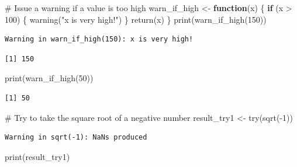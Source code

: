 \documentclass[
  letterpaper,
  DIV=11,
  numbers=noendperiod]{scrartcl}
\newenvironment{Shaded}{\begin{snugshade}}{\end{snugshade}}
\newcommand{\CommentTok}[1]{\textcolor[rgb]{0.37,0.37,0.37}{#1}}
\newcommand{\ControlFlowTok}[1]{\textcolor[rgb]{0.00,0.23,0.31}{\textbf{#1}}}
\newcommand{\DecValTok}[1]{\textcolor[rgb]{0.68,0.00,0.00}{#1}}
\newcommand{\FunctionTok}[1]{\textcolor[rgb]{0.28,0.35,0.67}{#1}}
\newcommand{\NormalTok}[1]{\textcolor[rgb]{0.00,0.23,0.31}{#1}}
\newcommand{\OtherTok}[1]{\textcolor[rgb]{0.00,0.23,0.31}{#1}}
\newcommand{\SpecialCharTok}[1]{\textcolor[rgb]{0.37,0.37,0.37}{#1}}
\newcommand{\StringTok}[1]{\textcolor[rgb]{0.13,0.47,0.30}{#1}}
\begin{document}
\begin{Shaded}
\begin{Highlighting}[]
\CommentTok{\#   Issue a warning if a value is too high}
\NormalTok{warn\_if\_high }\OtherTok{\textless{}{-}} \ControlFlowTok{function}\NormalTok{(x) \{}
  \ControlFlowTok{if}\NormalTok{ (x }\SpecialCharTok{\textgreater{}} \DecValTok{100}\NormalTok{) \{}
    \FunctionTok{warning}\NormalTok{(}\StringTok{"x is very high!"}\NormalTok{)}
\NormalTok{  \}}
  \FunctionTok{return}\NormalTok{(x)}
\NormalTok{\}}
\FunctionTok{print}\NormalTok{(}\FunctionTok{warn\_if\_high}\NormalTok{(}\DecValTok{150}\NormalTok{))}
\end{Highlighting}
\end{Shaded}

\begin{verbatim}
Warning in warn_if_high(150): x is very high!
\end{verbatim}

\begin{verbatim}
[1] 150
\end{verbatim}

\begin{Shaded}
\begin{Highlighting}[]
\FunctionTok{print}\NormalTok{(}\FunctionTok{warn\_if\_high}\NormalTok{(}\DecValTok{50}\NormalTok{))}
\end{Highlighting}
\end{Shaded}

\begin{verbatim}
[1] 50
\end{verbatim}

\begin{Shaded}
\begin{Highlighting}[]
\CommentTok{\#   Try to take the square root of a negative number}
\NormalTok{result\_try1 }\OtherTok{\textless{}{-}} \FunctionTok{try}\NormalTok{(}\FunctionTok{sqrt}\NormalTok{(}\SpecialCharTok{{-}}\DecValTok{1}\NormalTok{))}
\end{Highlighting}
\end{Shaded}

\begin{verbatim}
Warning in sqrt(-1): NaNs produced
\end{verbatim}

\begin{Shaded}
\begin{Highlighting}[]
\FunctionTok{print}\NormalTok{(result\_try1)}
\end{Highlighting}
\end{Shaded}
\end{document}
